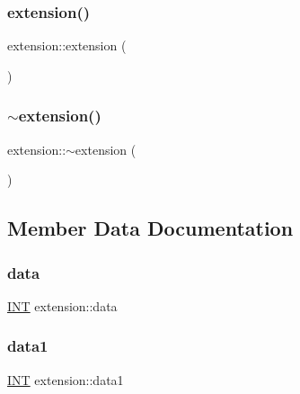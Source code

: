 \subsubsection{\texorpdfstring{extension()}{extension()}}
{\footnotesize\ttfamily extension\+::extension (\begin{DoxyParamCaption}{ }\end{DoxyParamCaption})}

\mbox{\label{classextension_a95da97cca26fe005104623c7799cd892}} 
\subsubsection{\texorpdfstring{$\sim$extension()}{~extension()}}
{\footnotesize\ttfamily extension\+::$\sim$extension (\begin{DoxyParamCaption}{ }\end{DoxyParamCaption})}



\subsection{Member Data Documentation}
\mbox{\label{classextension_a4e2eee6318ae83b188c1c5fd50aa6d86}} 
\subsubsection{\texorpdfstring{data}{data}}
{\footnotesize\ttfamily \mbox{\hyperlink{galois_8h_a09fddde158a3a20bd2dcadb609de11dc}{I\+NT}} extension\+::data}

\mbox{\label{classextension_a174fc1205114cab75254c6b7888e48be}} 
\subsubsection{\texorpdfstring{data1}{data1}}
{\footnotesize\ttfamily \mbox{\hyperlink{galois_8h_a09fddde158a3a20bd2dcadb609de11dc}{I\+NT}} extension\+::data1}

\mbox{\label{classextension_a0c42e7fa4e1e4f42ed1b861939dc5de6}} 
